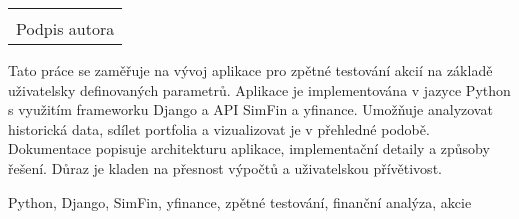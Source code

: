 \documentclass[12pt, a4paper]{report}
\newcommand\datumOdevzdani{31. 12. 2024}
\begin{document}
	\vspace*{0.7\textheight} %

	\vfill
	\noindent{V Opavě \datumOdevzdani\\}
	\noindent
	\begin{minipage}{\linewidth}
		\hspace{9.5cm} 
		\begin{tabular}{@{}p{6cm}@{}}
			\dotfill \\
			Podpis autora
		\end{tabular}
	\end{minipage}
	
	\clearpage

	\tableofcontents
	\clearpage
Tato práce se zaměřuje na vývoj aplikace pro zpětné testování akcií na základě uživatelsky definovaných parametrů. Aplikace je implementována v jazyce Python s využitím frameworku Django a API SimFin a yfinance. Umožňuje analyzovat historická data, sdílet portfolia a vizualizovat je v přehledné podobě. Dokumentace popisuje architekturu aplikace, implementační detaily a způsoby řešení. Důraz je kladen na přesnost výpočtů a uživatelskou přívětivost. 

\vspace{18pt}

\noindent Python, Django, SimFin, yfinance, zpětné testování, finanční analýza, akcie


\end{document}
